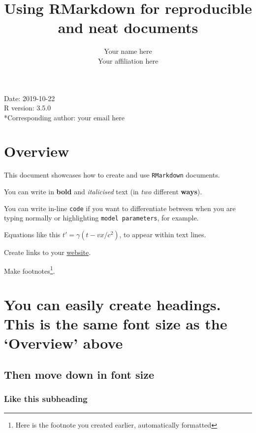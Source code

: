 \documentclass[portrait]{article}
\title{Using RMarkdown for reproducible and neat documents}
\author{Your name here\\[2\baselineskip]Your affiliation here}
\date{}
\begin{document}
\maketitle

{
\setcounter{tocdepth}{4}
\tableofcontents
}
\newpage   

Date: 2019-10-22\\
R version: 3.5.0\\
*Corresponding author: your email here

\newpage    

\section{Overview}\label{overview}

This document showcases how to create and use \texttt{RMarkdown}
documents.

You can write in \textbf{bold} and \emph{italicised} text (in \emph{two}
different \textbf{ways}).

You can write in-line \texttt{code} if you want to differentiate between
when you are typing normally or highlighting \texttt{model\ parameters},
for example.

Equations like this \(t' = \gamma(t - vx/c^{2})\), to appear within text
lines.

Create links to your \href{https://github.com/darwinanddavis}{website}.

Make footnotes\footnote{Here is the footnote you created earlier,
  automatically formatted}.

\section{\texorpdfstring{You can easily create headings. This is the
same font size as the `Overview'
above}{You can easily create headings. This is the same font size as the Overview above}}\label{you-can-easily-create-headings.-this-is-the-same-font-size-as-the-overview-above}

\subsection{Then move down in font
size}\label{then-move-down-in-font-size}

\subsubsection{Like this subheading}\label{like-this-subheading}
\end{document}
